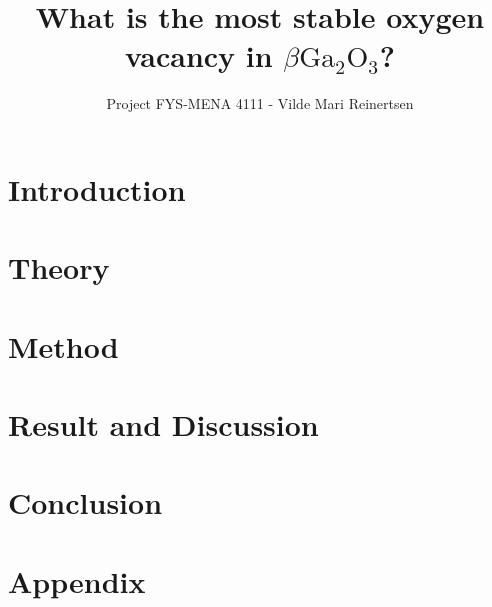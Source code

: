 

\title{What is the most stable oxygen vacancy in $\beta \text{Ga}_2\text{O}_3$?}
\author{Project FYS-MENA 4111 - Vilde Mari Reinertsen}
\raggedbottom



\maketitle

\begin{abstract}

  
\tableofcontents
\end{abstract}

\twocolumn

\section{Introduction}


\section{Theory}


\section{Method}


\section{Result  and Discussion}


%

\section{Conclusion}


\newpage



\section*{Appendix}



